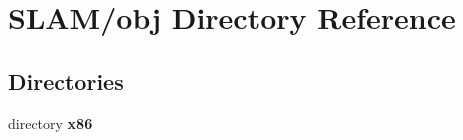 \section{S\-L\-A\-M/obj Directory Reference}
\label{dir_141a43f682233ff7d7ae36f04f282f8c}
\subsection*{Directories}
\begin{DoxyCompactItemize}
\item 
directory {\bf x86}
\end{DoxyCompactItemize}
